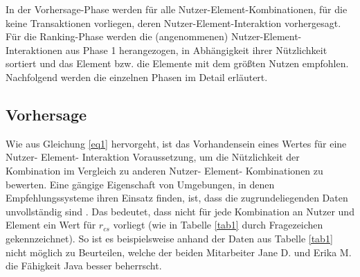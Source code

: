 In der Vorhersage-Phase werden für alle Nutzer-Element-Kombinationen, für die keine Transaktionen vorliegen, deren Nutzer-Element-Interaktion vorhergesagt.
Für die Ranking-Phase werden die (angenommenen) Nutzer-Element-Interaktionen aus Phase 1 herangezogen, in Abhängigkeit ihrer Nützlichkeit sortiert und das Element bzw. die Elemente mit dem größten Nutzen empfohlen.
Nachfolgend werden die einzelnen Phasen im Detail erläutert.

\subsection{Vorhersage}
\label{ch:empfehlungssysteme:empfehlungserstellung:prediction}
Wie aus Gleichung \ref{eq1} hervorgeht, ist das Vorhandensein eines Wertes für eine Nutzer- Element- Interaktion Voraussetzung, um die Nützlichkeit der Kombination im Vergleich zu anderen Nutzer- Element- Kombinationen zu bewerten.
Eine gängige Eigenschaft von Umgebungen, in denen Empfehlungssysteme ihren Einsatz finden, ist, dass die zugrundeliegenden Daten unvollständig sind \cite[S. 735]{adomavicius:inproceedings}.
Das bedeutet, dass nicht für jede Kombination an Nutzer und Element ein Wert für $r_{cs}$ vorliegt (wie in Tabelle \ref{tab1} durch Fragezeichen gekennzeichnet).
So ist es beispielsweise anhand der Daten aus Tabelle \ref{tab1} nicht möglich zu Beurteilen, welche der beiden Mitarbeiter Jane D. und Erika M. die Fähigkeit Java besser beherrscht.

